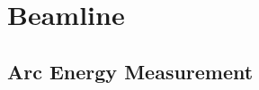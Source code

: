 \chapter{Beamline}
\graphicspath{{beamline/figs/}}
\renewcommand{\dirfig}[0]{beamline/figs}
\renewcommand{\dircur}[0]{beamline}


\newpage

\newpage

\newpage
\section{Arc Energy Measurement}

\newpage

\newpage

\newpage

\newpage

\newpage


%
